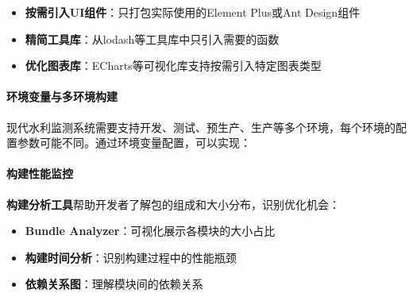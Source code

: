 \begin{itemize}
\tightlist
\item
  \textbf{按需引入UI组件}：只打包实际使用的Element Plus或Ant Design组件
\item
  \textbf{精简工具库}：从lodash等工具库中只引入需要的函数
\item
  \textbf{优化图表库}：ECharts等可视化库支持按需引入特定图表类型
\end{itemize}

\paragraph{环境变量与多环境构建}\label{ux73afux5883ux53d8ux91cfux4e0eux591aux73afux5883ux6784ux5efa}

现代水利监测系统需要支持开发、测试、预生产、生产等多个环境，每个环境的配置参数可能不同。通过环境变量配置，可以实现：

\begin{Shaded}
\begin{Highlighting}[]
\OperatorTok{=}\NormalTok{ \{}
  \OperatorTok{:}\NormalTok{ \{}
    \OperatorTok{:} \OperatorTok{,}
    \OperatorTok{:} 
\NormalTok{  \}}\OperatorTok{,}
  \OperatorTok{:}\NormalTok{ \{}
    \OperatorTok{:} \OperatorTok{,}
    \OperatorTok{:} 
\NormalTok{  \}}
\NormalTok{\}}
\end{Highlighting}
\end{Shaded}

\paragraph{构建性能监控}\label{ux6784ux5efaux6027ux80fdux76d1ux63a7}

\textbf{构建分析工具}帮助开发者了解包的组成和大小分布，识别优化机会：

\begin{itemize}
\tightlist
\item
  \textbf{Bundle Analyzer}：可视化展示各模块的大小占比
\item
  \textbf{构建时间分析}：识别构建过程中的性能瓶颈
\item
  \textbf{依赖关系图}：理解模块间的依赖关系
\end{itemize}

